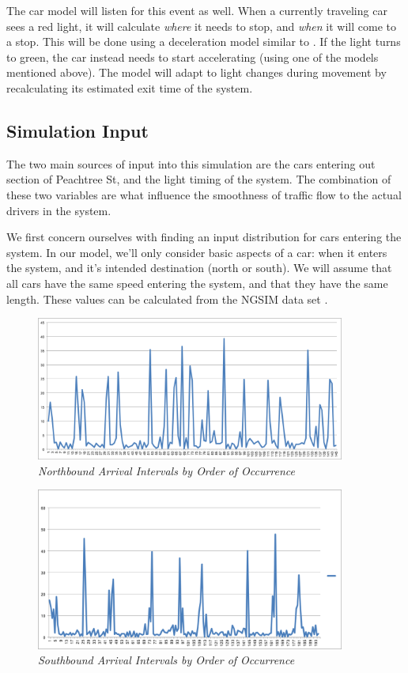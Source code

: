 \documentclass[a4paper,12pt]{article}
\begin{document}
The car model will listen for this event as well. When a currently traveling car sees a red light, it will calculate
\emph{where} it needs to stop, and \emph{when} it will come to a stop. This will be done using a deceleration model
similar to \cite{deceleration}. If the light turns to green, the car instead needs to start accelerating (using one of
the models mentioned above). The model will adapt to light changes during movement by recalculating its estimated
exit time of the system.

\subsection{Simulation Input}
The two main sources of input into this simulation are the cars entering out section of Peachtree St, and the light
timing of the system. The combination of these two variables are what influence the smoothness
of traffic flow to the actual drivers in the system.

We first concern ourselves with finding an input distribution for cars entering the system. In our model, we'll only
consider basic aspects of a car: when it enters the system, and it's intended destination (north or south). We will assume that all cars have the same speed entering the system, and that they
have the same length. These values can be calculated from the NGSIM data set \cite{ngsim}.

\begin{figure}
\begin{center}  
\includegraphics[width=4in]{../northbound.png}  
\caption{\small \sl Northbound Arrival Intervals by Order of Occurrence\label{fig:northbound_arrival}}  
\end{center}  
\end{figure} 

\begin{figure}  
\begin{center}
\includegraphics[width=4in]{../southbound.png}
\caption{\small \sl Southbound Arrival Intervals by Order of Occurrence\label{fig:southbound_arrival}}  
\end{center}  
\end{figure} 
\end{document}

